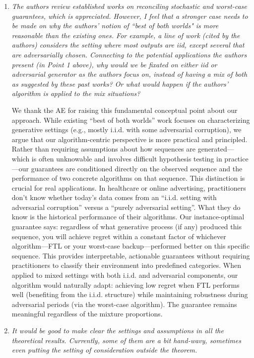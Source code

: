 \documentclass[11pt]{article}
\begin{document}
\begin{enumerate}
    \item \emph{The authors review established works on reconciling stochastic and worst-case guarantees, which is appreciated. However, I feel that a stronger case needs to be made on why the authors' notion of ``best of both worlds" is more reasonable than the existing ones. For example, a line of work (cited by the authors) considers the setting where most outputs are iid, except several that are adversarially chosen. Connecting to the potential applications the authors present (in Point 1 above), why would we be fixated on either iid or adversarial generator as the authors focus on, instead of having a mix of both as suggested by these past works? Or what would happen if the authors' algorithm is applied to the mix situations?}

    We thank the AE for raising this fundamental conceptual point about our approach. While existing ``best of both worlds'' work focuses on characterizing generative settings (e.g., mostly i.i.d. with some adversarial corruption), we argue that our algorithm-centric perspective is more practical and principled. Rather than requiring assumptions about how sequences are generated—which is often unknowable and involves difficult hypothesis testing in practice—our guarantees are conditioned directly on the observed sequence and the performance of two concrete algorithms on that sequence.
This distinction is crucial for real applications. In healthcare or online advertising, practitioners don't know whether today's data comes from an ``i.i.d. setting with adversarial corruption'' versus a ``purely adversarial setting''. What they do know is the historical performance of their algorithms. Our instance-optimal guarantee says: regardless of what generative process (if any) produced this sequence, you will achieve regret within a constant factor of whichever algorithm—FTL or your worst-case backup—performed better on this specific sequence. This provides interpretable, actionable guarantees without requiring practitioners to classify their environment into predefined categories.
When applied to mixed settings with both i.i.d. and adversarial components, our algorithm would naturally adapt: achieving low regret when FTL performs well (benefiting from the i.i.d. structure) while maintaining robustness during adversarial periods (via the worst-case algorithm). The guarantee remains meaningful regardless of the mixture proportions.


    \item \emph{ It would be good to make clear the settings and assumptions in all the theoretical results. Currently, some of them are a bit hand-wavy, sometimes even putting the setting of consideration outside the theorem.}


\end{enumerate}
\end{document}
